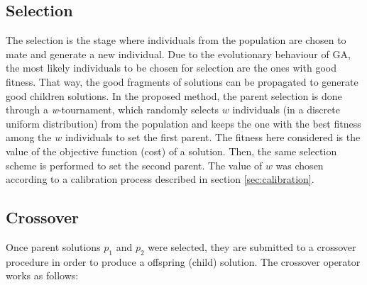 \subsection{Selection}
\label{subsec:selection}
The selection is the stage where individuals from the population are chosen to mate and generate a new individual. Due to the evolutionary behaviour of GA, the most likely individuals to be chosen for selection are the ones with good fitness. That way, the good fragments of solutions can be propagated to generate good children solutions. In the proposed method, the parent selection is done through a \textit{w}-tournament, which randomly selects $w$ individuals (in a discrete uniform distribution) from the population and keeps the one with the best fitness among the $w$ individuals to set the first parent. The fitness here considered is the value of the objective function (cost) of a solution. Then, the same selection scheme is performed to set the second parent. The value of $w$ was chosen according to a calibration process described in section \ref{sec:calibration}.

\subsection{Crossover}
\label{subsec:crossover}
Once parent solutions $p_1$ and $p_2$ were selected, they are submitted to a crossover procedure in order to produce a offspring (child) solution. The crossover operator works as follows:

